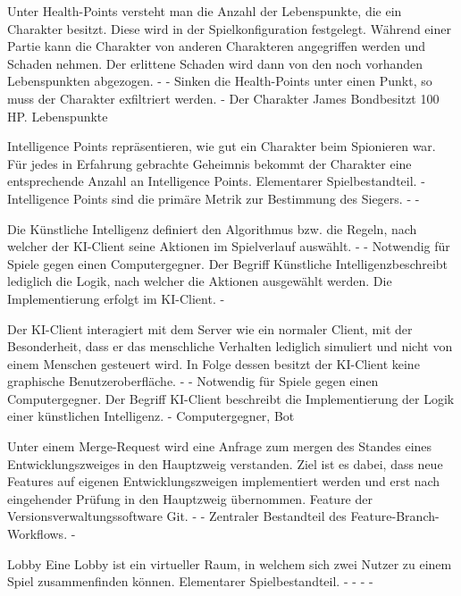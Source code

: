 {Unter Health-Points versteht man die Anzahl der Lebenspunkte, die ein Charakter besitzt. Diese wird in der Spielkonfiguration festgelegt. Während einer Partie kann die Charakter von anderen Charakteren angegriffen werden und Schaden nehmen. Der erlittene Schaden wird dann von den noch vorhanden Lebenspunkten abgezogen.}
{-}
{-}
{Sinken die Health-Points unter einen Punkt, so muss der Charakter exfiltriert werden.}
{-}
{Der Charakter \glqq James Bond\grqq besitzt 100 HP.}
{Lebenspunkte}

{Intelligence Points repräsentieren, wie gut ein Charakter beim Spionieren war. Für jedes in Erfahrung gebrachte Geheimnis bekommt der Charakter eine entsprechende Anzahl an Intelligence Points.}
{Elementarer Spielbestandteil.}
{-}
{Intelligence Points sind die primäre Metrik zur Bestimmung des Siegers.}
{-}
{-}

{Die Künstliche Intelligenz definiert den Algorithmus bzw. die Regeln, nach welcher der KI-Client seine Aktionen im Spielverlauf auswählt.}
{-}
{-}
{Notwendig für Spiele gegen einen Computergegner.}
{Der Begriff \glqq Künstliche Intelligenz\grqq beschreibt lediglich die Logik, nach welcher die Aktionen ausgewählt werden. Die Implementierung erfolgt im KI-Client.}
{-}

{Der KI-Client interagiert mit dem Server wie ein normaler Client, mit der Besonderheit, dass er das menschliche Verhalten lediglich simuliert und nicht von einem Menschen gesteuert wird. In Folge dessen besitzt der KI-Client keine graphische Benutzeroberfläche. }
{-}
{-}
{Notwendig für Spiele gegen einen Computergegner.}
{Der Begriff KI-Client beschreibt die Implementierung der Logik einer künstlichen Intelligenz.}
{-}
{Computergegner, Bot}

{Unter einem Merge-Request wird eine Anfrage zum \glqq mergen \grqq des Standes eines Entwicklungszweiges in den Hauptzweig verstanden. Ziel ist es dabei, dass neue Features auf eigenen Entwicklungszweigen implementiert werden und erst nach eingehender Prüfung in den Hauptzweig übernommen.}
{Feature der Versionsverwaltungssoftware Git.}
{-}
{-}
{Zentraler Bestandteil des Feature-Branch-Workflows.}
{-}

\Fachwissen
{Lobby}
{Eine Lobby ist ein virtueller Raum, in welchem sich zwei Nutzer zu einem Spiel zusammenfinden können.}
{Elementarer Spielbestandteil.}
{-}
{-}
{-}
{-}

